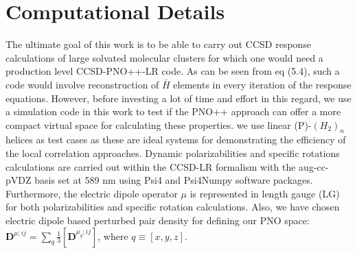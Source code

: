 \section{Computational Details}
The ultimate goal of this work is to be able to carry out CCSD response calculations of large solvated molecular clusters
for which one would need a production level CCSD-PNO++-LR code. As can be seen from eq (5.4), such a code would
involve reconstruction of $\bar{H}$ elements in every iteration of the response equations. 
However, before investing a lot of time and effort in this regard, we use a simulation code in 
this work to test if the PNO++ approach can offer a more compact virtual space for calculating these properties. 
we use linear (P)-$(H_2)_n$ helices as test cases as these are ideal systems for demonstrating 
the efficiency of the local correlation approaches.
Dynamic polarizabilities and specific rotations calculations are carried out within the CCSD-LR
formalism with the aug-cc-pVDZ\cite{Dunning89,Kendall92,Woon94} basis set at 589 nm using Psi4 and Psi4Numpy software packages\cite{Parrish17,Smith18}. Furthermore, the electric dipole operator $\mu$ is represented in length gauge (LG) for both polarizabilities
and specific rotation calculations. Also, we have chosen electric dipole based perturbed pair density for defining
our PNO space:  %
$ {\bm{D}^{\mu;ij}} = \sum\limits_q \frac{1}{3}[{\bm{D}^{\mu_q;ij}}]$, where $q \equiv [x,y,z]$.
